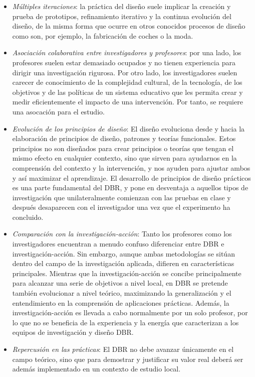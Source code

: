 \begin{itemize}
\item \emph{Múltiples iteraciones}: la práctica del diseño suele implicar la creación y prueba de prototipos, refinamiento iterativo y la continua evolución del diseño, de la misma forma que ocurre en otros conocidos procesos de diseño como son, por ejemplo, la fabricación de coches o la moda.
\item \emph{Asociación colaborativa entre investigadores y profesores}: por una lado, los profesores suelen estar demasiado ocupados y no tienen experiencia para dirigir una investigación rigurosa. Por otro lado, los investigadores suelen carecer de conocimiento de la complejidad cultural, de la tecnología, de los objetivos y de las políticas de un sistema educativo que les permita crear y medir eficientemente el impacto de una intervención. Por tanto, se requiere una asocación para el estudio.
\item \emph{Evolución de los principios de diseño}: El diseño evoluciona desde y hacia la elaboración de principios de diseño, patrones y teorías funcionales. Estos principios no son diseñados para crear principios o teorías que tengan el mismo efecto en cualquier contexto, sino que sirven para ayudarnos en la comprensión del contexto y la intervención, y nos ayuden para ajustar ambos y así maximizar el aprendizaje.  El desarrollo de principios de diseño prácticos es una parte fundamental del DBR, y pone en desventaja a aquellos tipos de investigación que unilateralmente comienzan con las pruebas en clase y después desaparecen con el investigador una vez que el experimento ha concluido.
\item \emph{Comparación con la investigación-acción}: Tanto los profesores como los investigadores encuentran a menudo confuso diferenciar entre DBR e investigación-acción. Sin embargo, aunque ambas metodologías se sitúan dentro del campo de la investigación aplicada, difieren en características principales. Mientras que la investigación-acción se concibe principalmente para alcanzar una serie de objetivos a nivel local, en DBR se pretende también evolucionar a nivel teórico, maximizando la generalización y el entendimiento en la comprensión de aplicaciones prácticas. Además, la investigación-acción es llevada a cabo normalmente por un solo profesor, por lo que no se beneficia de la experiencia y la energía que caracterizan a los equipos de investigación y diseño DBR.
\item \emph{Repercusión en las prácticas}: El DBR no debe avanzar únicamente en el campo teórico, sino que para demostrar y justificar su valor real deberá ser además implementado en un contexto de estudio local.
\end{itemize}

